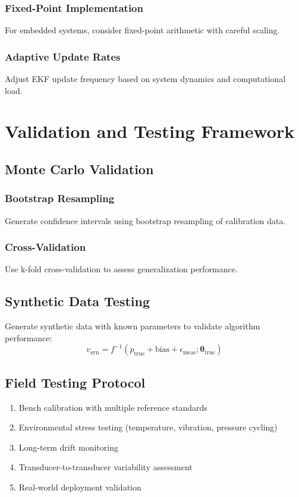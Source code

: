\documentclass[11pt]{article}
\begin{document}
\subsubsection{Fixed-Point Implementation}
For embedded systems, consider fixed-point arithmetic with careful scaling.

\subsubsection{Adaptive Update Rates}
Adjust EKF update frequency based on system dynamics and computational load.

\section{Validation and Testing Framework}

\subsection{Monte Carlo Validation}

\subsubsection{Bootstrap Resampling}
Generate confidence intervals using bootstrap resampling of calibration data.

\subsubsection{Cross-Validation}
Use k-fold cross-validation to assess generalization performance.

\subsection{Synthetic Data Testing}

Generate synthetic data with known parameters to validate algorithm performance:
\begin{equation}
v_{\text{syn}} = f^{-1}(p_{\text{true}} + \text{bias} + \epsilon_{\text{meas}}; \bm{\theta}_{\text{true}})
\end{equation}

\subsection{Field Testing Protocol}

\begin{enumerate}
\item Bench calibration with multiple reference standards
\item Environmental stress testing (temperature, vibration, pressure cycling)
\item Long-term drift monitoring
\item Transducer-to-transducer variability assessment
\item Real-world deployment validation
\end{enumerate}
\end{document}
